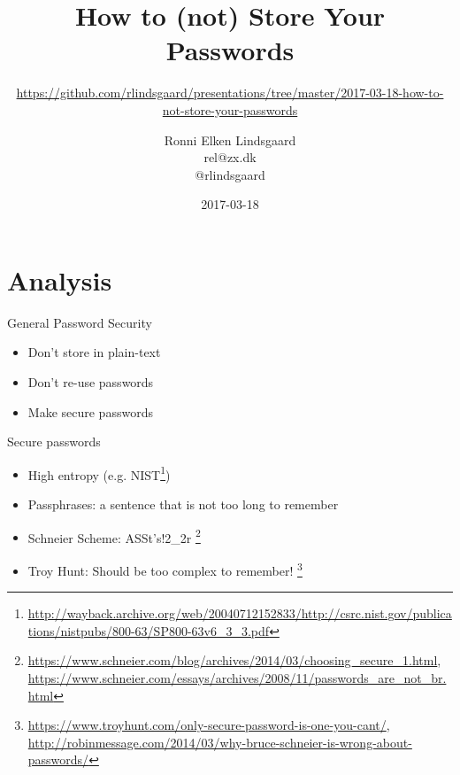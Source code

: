 \documentclass{beamer}
\title{How to (not) Store Your Passwords}
\subtitle{\url{https://github.com/rlindsgaard/presentations/tree/master/2017-03-18-how-to-not-store-your-passwords}}
\author{Ronni Elken Lindsgaard \\ rel@zx.dk \\ @rlindsgaard}
\date{2017-03-18}
\begin{document}
\begin{frame}
  \maketitle
\end{frame}

\begin{frame}
  \tableofcontents
\end{frame}

\section{Analysis}
\begin{frame}{General Password Security}
  \begin{block}{}
    \begin{itemize}
      \item Don't store in plain-text
      \item Don't re-use passwords
      \item Make secure passwords
    \end{itemize}
  \end{block}
\end{frame}

\begin{frame}{Secure passwords}
  \begin{itemize}
    \item High entropy (e.g. NIST\footnote{\url{http://wayback.archive.org/web/20040712152833/http://csrc.nist.gov/publications/nistpubs/800-63/SP800-63v6_3_3.pdf}})
    \item Passphrases: a sentence that is not too long to remember
    \item Schneier Scheme: ASSt's!2\_2r \footnote{\url{https://www.schneier.com/blog/archives/2014/03/choosing_secure_1.html}, \url{https://www.schneier.com/essays/archives/2008/11/passwords_are_not_br.html}}
    \item Troy Hunt: Should be too complex to remember! \footnote{\url{https://www.troyhunt.com/only-secure-password-is-one-you-cant/}, \url{http://robinmessage.com/2014/03/why-bruce-schneier-is-wrong-about-passwords/}}
  \end{itemize}
\end{frame}
\end{document}
